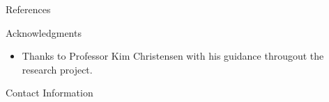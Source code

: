 \documentclass[final,hyperref={pdfpagelabels=false}]{beamer}
\begin{document}
\begin{frame}[t]
\begin{columns}[t]
\begin{column}{.465\textwidth}
\begin{block}{References}
        
\nocite{*} %
\small{
}

\end{block}
        

 
  
 



\begin{block}{Acknowledgments}

\begin{itemize}
\item Thanks to Professor Kim Christensen with his guidance througout the research project. 
\end{itemize}

\end{block}



\begin{block}{Contact Information}


\end{block}
\end{column}
\end{columns}
\end{frame}
\end{document}
